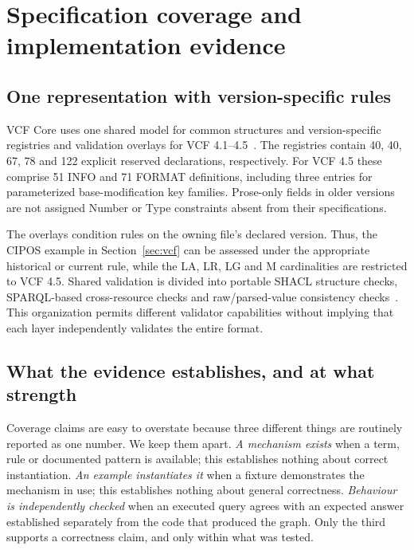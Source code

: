 \documentclass{ceurart}
\begin{document}
\section{Specification coverage and implementation evidence}
\label{sec:coverage}

\subsection{One representation with version-specific rules}

VCF Core uses one shared model for common structures and version-specific registries and validation overlays for VCF 4.1--4.5~\cite{vcfc210}. 
The registries contain 40, 40, 67, 78 and 122 explicit reserved declarations, respectively. 
For VCF 4.5 these comprise 51 INFO and 71 FORMAT definitions, including three entries for parameterized base-modification key families. 
Prose-only fields in older versions are not assigned Number or Type constraints absent from their specifications.

The overlays condition rules on the owning file's declared version. 
Thus, the CIPOS example in Section~\ref{sec:vcf} can be assessed under the appropriate historical or current rule, while the LA, LR, LG and M cardinalities are restricted to VCF 4.5. 
Shared validation is divided into portable SHACL structure checks, SPARQL-based cross-resource checks and raw/parsed-value consistency checks~\cite{shacl2017,vcfc210}. 
This organization permits different validator capabilities without implying that each layer independently validates the entire format.

\subsection{What the evidence establishes, and at what strength}
\label{sec:evidence}

Coverage claims are easy to overstate because three different things are routinely reported as one number. 
We keep them apart. 
\emph{A mechanism exists} when a term, rule or documented pattern is available; this establishes nothing about correct instantiation. 
\emph{An example instantiates it} when a fixture demonstrates the mechanism in use; this establishes nothing about general correctness. 
\emph{Behaviour is independently checked} when an executed query agrees with an expected answer established separately from the code that produced the graph. 
Only the third supports a correctness claim, and only within what was tested.
\end{document}

